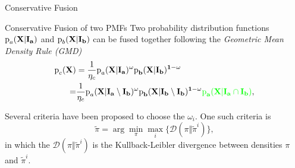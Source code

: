 \documentclass{beamer}
\newcommand{\vect}{\bf}
\theoremstyle{remark}
\newcommand{\pr}{\textrm{p}}
\begin{document}
\begin{frame}{Conservative Fusion}
		\begin{exampleblock}{Conservative Fusion of two PMFs}
				Two probability distribution functions $\pr_a(\vect{X | \vect{I}_a})$ and $\pr_b(\vect{X} | \vect{I}_b)$ can be fused together following the {\color{blue}\emph{Geometric Mean Density Rule (GMD)}}
				\begin{equation*}
				\begin{aligned}
				\pr_c(\vect{X})&= \frac{1}{\eta_c} \pr_a(\vect{X| \vect{I}_a})^\omega \pr_b(\vect{X| \vect{I}_b})^{1-\omega}\\
				=& \frac{1}{\eta_c} \pr_a(\vect{X| \vect{I}_a} \setminus \vect{I}_b)^\omega \pr_b(\vect{X| \vect{I}_b} \setminus \vect{I}_b)^{1-\omega} {\color{green}\pr_a(\vect{X| \vect{I}_a} \cap \vect{I}_b)},\\
				\end{aligned}
				\end{equation*}
		\end{exampleblock}
	
	\begin{exampleblock}{}
		Several criteria have been proposed to choose the $\omega_i$. One such criteria is \citep{ajgl2015design}
		\begin{equation*}
		\label{eq:crit}
		\tilde{\pi}=\arg\min_{\pi}\max_i\{\mathcal{D}(\pi\Vert \tilde{\pi}^{i})\}, \end{equation*}
		in which the $\mathcal{D}(\pi\Vert \tilde{\pi}^{i})$ is the {\color{red}Kullback-Leibler divergence} between densities $\pi$ and $\tilde{\pi}^i$.
	\end{exampleblock}
\end{frame}
\end{document}
